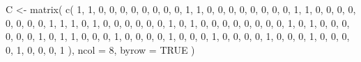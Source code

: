 \documentclass[
]{article}
\newenvironment{Shaded}{\begin{snugshade}}{\end{snugshade}}
\newcommand{\AttributeTok}[1]{\textcolor[rgb]{0.77,0.63,0.00}{#1}}
\newcommand{\ConstantTok}[1]{\textcolor[rgb]{0.00,0.00,0.00}{#1}}
\newcommand{\DecValTok}[1]{\textcolor[rgb]{0.00,0.00,0.81}{#1}}
\newcommand{\FunctionTok}[1]{\textcolor[rgb]{0.00,0.00,0.00}{#1}}
\newcommand{\NormalTok}[1]{#1}
\newcommand{\OtherTok}[1]{\textcolor[rgb]{0.56,0.35,0.01}{#1}}
\begin{document}
\begin{Shaded}
\begin{Highlighting}[]
\NormalTok{C }\OtherTok{\textless{}{-}} \FunctionTok{matrix}\NormalTok{(}
  \FunctionTok{c}\NormalTok{(}
    \DecValTok{1}\NormalTok{, }\DecValTok{1}\NormalTok{, }\DecValTok{0}\NormalTok{, }\DecValTok{0}\NormalTok{, }\DecValTok{0}\NormalTok{, }\DecValTok{0}\NormalTok{, }\DecValTok{0}\NormalTok{, }\DecValTok{0}\NormalTok{, }
    \DecValTok{0}\NormalTok{, }\DecValTok{0}\NormalTok{, }\DecValTok{1}\NormalTok{, }\DecValTok{1}\NormalTok{, }\DecValTok{0}\NormalTok{, }\DecValTok{0}\NormalTok{, }\DecValTok{0}\NormalTok{, }\DecValTok{0}\NormalTok{,}
    \DecValTok{0}\NormalTok{, }\DecValTok{0}\NormalTok{, }\DecValTok{0}\NormalTok{, }\DecValTok{0}\NormalTok{, }\DecValTok{1}\NormalTok{, }\DecValTok{1}\NormalTok{, }\DecValTok{0}\NormalTok{, }\DecValTok{0}\NormalTok{,}
    \DecValTok{0}\NormalTok{, }\DecValTok{0}\NormalTok{, }\DecValTok{0}\NormalTok{, }\DecValTok{0}\NormalTok{, }\DecValTok{0}\NormalTok{, }\DecValTok{0}\NormalTok{, }\DecValTok{1}\NormalTok{, }\DecValTok{1}\NormalTok{,}
    \DecValTok{1}\NormalTok{, }\DecValTok{0}\NormalTok{, }\DecValTok{1}\NormalTok{, }\DecValTok{0}\NormalTok{, }\DecValTok{0}\NormalTok{, }\DecValTok{0}\NormalTok{, }\DecValTok{0}\NormalTok{, }\DecValTok{0}\NormalTok{,}
    \DecValTok{0}\NormalTok{, }\DecValTok{1}\NormalTok{, }\DecValTok{0}\NormalTok{, }\DecValTok{1}\NormalTok{, }\DecValTok{0}\NormalTok{, }\DecValTok{0}\NormalTok{, }\DecValTok{0}\NormalTok{, }\DecValTok{0}\NormalTok{,}
    \DecValTok{0}\NormalTok{, }\DecValTok{0}\NormalTok{, }\DecValTok{0}\NormalTok{, }\DecValTok{0}\NormalTok{, }\DecValTok{1}\NormalTok{, }\DecValTok{0}\NormalTok{, }\DecValTok{1}\NormalTok{, }\DecValTok{0}\NormalTok{,}
    \DecValTok{0}\NormalTok{, }\DecValTok{0}\NormalTok{, }\DecValTok{0}\NormalTok{, }\DecValTok{0}\NormalTok{, }\DecValTok{0}\NormalTok{, }\DecValTok{1}\NormalTok{, }\DecValTok{0}\NormalTok{, }\DecValTok{1}\NormalTok{,}
    \DecValTok{1}\NormalTok{, }\DecValTok{0}\NormalTok{, }\DecValTok{0}\NormalTok{, }\DecValTok{0}\NormalTok{, }\DecValTok{1}\NormalTok{, }\DecValTok{0}\NormalTok{, }\DecValTok{0}\NormalTok{, }\DecValTok{0}\NormalTok{,}
    \DecValTok{0}\NormalTok{, }\DecValTok{1}\NormalTok{, }\DecValTok{0}\NormalTok{, }\DecValTok{0}\NormalTok{, }\DecValTok{0}\NormalTok{, }\DecValTok{1}\NormalTok{, }\DecValTok{0}\NormalTok{, }\DecValTok{0}\NormalTok{,}
    \DecValTok{0}\NormalTok{, }\DecValTok{0}\NormalTok{, }\DecValTok{1}\NormalTok{, }\DecValTok{0}\NormalTok{, }\DecValTok{0}\NormalTok{, }\DecValTok{0}\NormalTok{, }\DecValTok{1}\NormalTok{, }\DecValTok{0}\NormalTok{,}
    \DecValTok{0}\NormalTok{, }\DecValTok{0}\NormalTok{, }\DecValTok{0}\NormalTok{, }\DecValTok{1}\NormalTok{, }\DecValTok{0}\NormalTok{, }\DecValTok{0}\NormalTok{, }\DecValTok{0}\NormalTok{, }\DecValTok{1}
\NormalTok{  ),}
  \AttributeTok{ncol =} \DecValTok{8}\NormalTok{,}
  \AttributeTok{byrow =} \ConstantTok{TRUE}
\NormalTok{)}
\end{Highlighting}
\end{Shaded}
\end{document}
